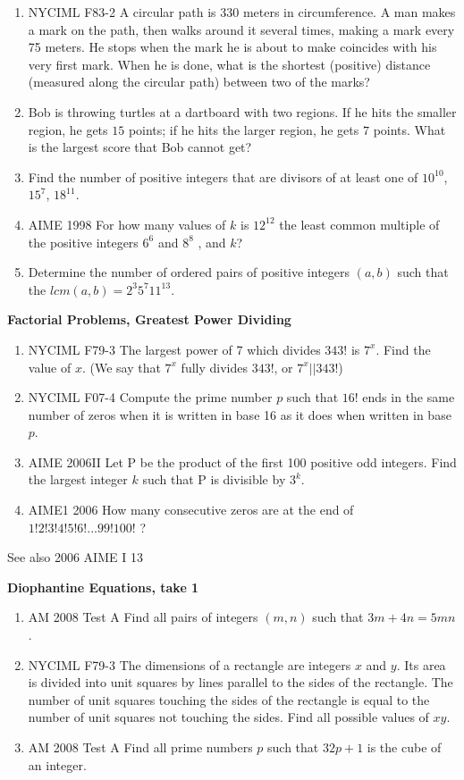 \documentclass{article}
\begin{document}
\begin{enumerate}
\item NYCIML F83-2 A circular path is 330 meters in circumference. A man makes a mark on the path, then walks around it several times, making a mark every 75 meters. He stops when the mark he is about to make coincides with his very first mark. When he is done, what is the shortest (positive) distance (measured along the circular path) between two of the marks?
\item Bob is throwing turtles at a dartboard with two regions.  If he hits the smaller region, he gets $15$ points; if he hits the larger region, he gets $7$ points.  What is the largest score that Bob cannot get?
\item Find the number of positive integers that are divisors of at least one of $10^{10}$, $15^7$, $18^{11}$.
\item AIME 1998 For how many values of $k$ is $12^{12}$ the least common multiple of the positive integers $6^6$ and $8^8$ , and $k$?
\item Determine the number of ordered pairs of positive integers $(a,b)$ such that the $lcm (a,b)=2^3 5^7 11^{13}$.
\end{enumerate}

\textbf{Factorial Problems, Greatest Power Dividing}

\begin{enumerate}
\item NYCIML F79-3 The largest power of 7 which divides $343!$ is $7^x$. Find the value of $x$. (We say that $7^x$ fully divides $343!$, or $7^x||343!$)
\item NYCIML F07-4 Compute the prime number $p$ such that $16!$ ends in the same number of zeros when it is written in base 16 as it does when written in base $p$.
\item AIME 2006II Let P be the product of the first 100 positive odd integers. Find the largest integer $k$ such that P is divisible by $3^k$.
\item AIME1 2006 How many consecutive zeros are at the end of $1!2!3!4!5!6!...99!100!$ ? 
\end{enumerate}
See also 2006 AIME I 13
\newline

\textbf{Diophantine Equations, take 1}
\begin{enumerate}
\item AM 2008 Test A Find all pairs of integers $(m,n)$ such that $3m+4n=5mn$.
\item NYCIML F79-3 The dimensions of a rectangle are integers $x$ and $y$. Its area is divided into unit squares by lines parallel to the sides of the rectangle. The number of unit squares touching the sides of the rectangle is equal to the number of unit squares not touching the sides. Find all possible values of $xy$.
\item AM 2008 Test A Find all prime numbers $p$ such that $32p + 1$ is the cube of an integer.
\end{enumerate}
\end{document}
